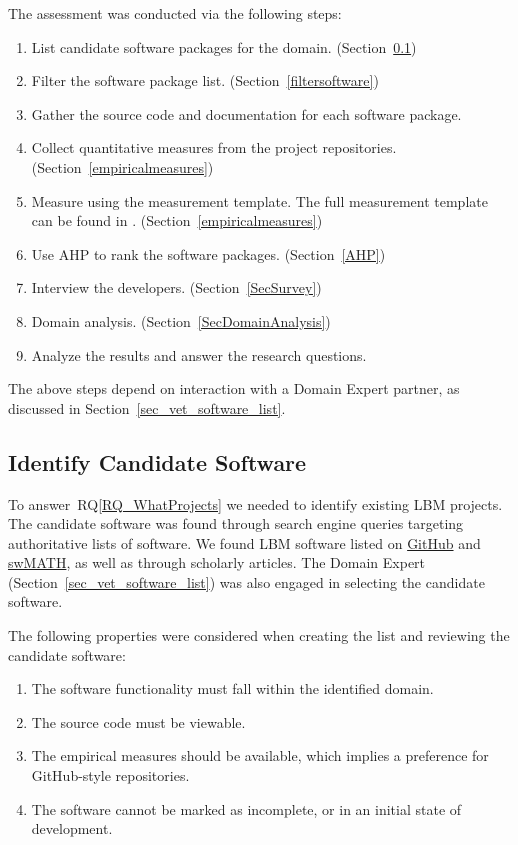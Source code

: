 \documentclass[final, 3p, times, authoryear]{elsarticle}
\newcommand{\rqref}[1]{RQ\ref{#1}}
\begin{document}
The assessment was conducted via the following steps: 

\begin{enumerate}
	\item List candidate software packages for the domain.
	(Section~\ref{identifysoftware})
	\item Filter the software package list. (Section~\ref{filtersoftware})
	\item Gather the source code and documentation for each software package.
	\item Collect quantitative measures from the project repositories.
	(Section~\ref{empiricalmeasures})
	\item Measure using the measurement template.  The full measurement template
	can be found in \citet{SmithEtAl2021}. (Section~\ref{empiricalmeasures})
	\item Use AHP to rank the software packages. (Section~\ref{AHP})
	\item Interview the developers. (Section~\ref{SecSurvey})
	\item Domain analysis. (Section~\ref{SecDomainAnalysis})
	\item Analyze the results and answer the research questions.
\end{enumerate}

\noindent The above steps depend on interaction with a Domain Expert partner, as
discussed in Section~\ref{sec_vet_software_list}.

\subsection{Identify Candidate Software} \label{identifysoftware}

To answer~\rqref{RQ_WhatProjects} we needed to identify existing LBM projects.
The candidate software was found through search engine queries targeting
authoritative lists of software. We found LBM software listed on
\href{https://github.com/} {GitHub} and \href{https://swmath.org/} {swMATH}, as
well as through scholarly articles. The Domain Expert
(Section~\ref{sec_vet_software_list}) was also engaged in selecting the
candidate software.

The following properties were considered when creating the list and reviewing
the candidate software:

\begin{enumerate}
	\item The software functionality must fall within the identified domain.
	\item The source code must be viewable.
	\item The empirical measures should be available, which implies a preference
	for GitHub-style repositories.
	\item The software cannot be marked as incomplete, or in an initial state of
	development.
\end{enumerate}
\end{document}
